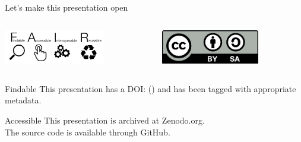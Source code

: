 \begin{frame}{Let's make this presentation open}

	\begin{columns}[t]
		\begin{column}{.45\textwidth}
		    \centering
		    \includegraphics[height=1.5cm]{images/1280px-FAIR_data_principles.jpg}

		\end{column}

		\begin{column}{.45\textwidth}
		    \centering
		    \includegraphics[height=1.5cm]{images/cc-by-sa.png}
        \end{column}
	\end{columns}

	\begin{columns}[t]
		\begin{column}{.45\textwidth}
		    \centering
		    \begin{block}{Findable}
			    This presentation has a DOI: %
			    () %
			    and has been tagged with appropriate metadata.
		    \end{block}

		    \begin{block}{Accessible}
			    This presentation is archived at Zenodo.org. \\
			    The source code is available through GitHub.
		    \end{block}
        \end{column}


\end{columns}
\end{frame}
